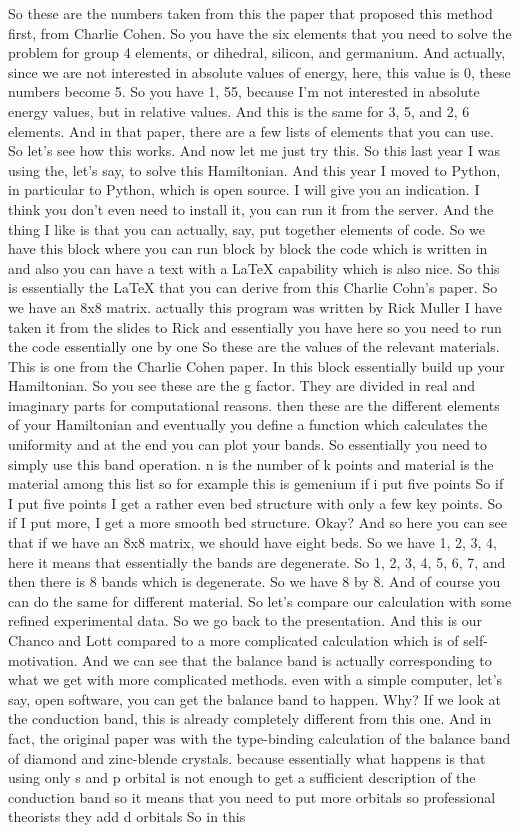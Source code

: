 So these are the numbers taken from this the paper that proposed this method first, from Charlie Cohen. So you have the six elements that you need to solve the problem for group 4 elements, or dihedral, silicon, and germanium. And actually, since we are not interested in absolute values of energy, here, this value is 0, these numbers become 5. So you have 1, 55, because I'm not interested in absolute energy values, but in relative values. And this is the same for 3, 5, and 2, 6 elements. And in that paper, there are a few lists of elements that you can use. So let's see how this works. And now let me just try this. So this last year I was using the, let's say, to solve this Hamiltonian. And this year I moved to Python, in particular to Python, which is open source. I will give you an indication. I think you don't even need to install it, you can run it from the server. And the thing I like is that you can actually, say, put together elements of code. So we have this block where you can run block by block the code which is written in and also you can have a text with a LaTeX capability which is also nice. So this is essentially the LaTeX that you can derive from this Charlie Cohn's paper. So we have an 8x8 matrix. actually this program was written by Rick Muller I have taken it from the slides to Rick and essentially you have here so you need to run the code essentially one by one So these are the values of the relevant materials. This is one from the Charlie Cohen paper. In this block essentially build up your Hamiltonian. So you see these are the g factor. They are divided in real and imaginary parts for computational reasons. then these are the different elements of your Hamiltonian and eventually you define a function which calculates the uniformity and at the end you can plot your bands. So essentially you need to simply use this band operation. n is the number of k points and material is the material among this list so for example this is gemenium if i put five points So if I put five points I get a rather even bed structure with only a few key points. So if I put more, I get a more smooth bed structure. Okay? And so here you can see that if we have an 8x8 matrix, we should have eight beds. So we have 1, 2, 3, 4, here it means that essentially the bands are degenerate. So 1, 2, 3, 4, 5, 6, 7, and then there is 8 bands which is degenerate. So we have 8 by 8. And of course you can do the same for different material. So let's compare our calculation with some refined experimental data. So we go back to the presentation. And this is our Chanco and Lott compared to a more complicated calculation which is of self-motivation. And we can see that the balance band is actually corresponding to what we get with more complicated methods. even with a simple computer, let's say, open software, you can get the balance band to happen. Why? If we look at the conduction band, this is already completely different from this one. And in fact, the original paper was with the type-binding calculation of the balance band of diamond and zinc-blende crystals. because essentially what happens is that using only s and p orbital is not enough to get a sufficient description of the conduction band so it means that you need to put more orbitals so professional theorists they add d orbitals So in this 